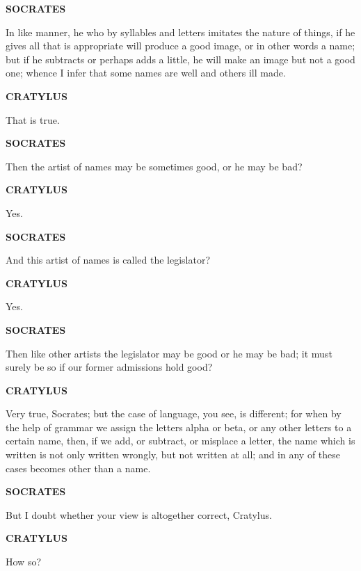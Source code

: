 \documentclass[11pt,letter]{article}
\begin{document}
\par \textbf{SOCRATES}
\par   In like manner, he who by syllables and letters imitates the nature of things, if he gives all that is appropriate will produce a good image, or in other words a name; but if he subtracts or perhaps adds a little, he will make an image but not a good one; whence I infer that some names are well and others ill made.

\par \textbf{CRATYLUS}
\par   That is true.

\par \textbf{SOCRATES}
\par   Then the artist of names may be sometimes good, or he may be bad?

\par \textbf{CRATYLUS}
\par   Yes.

\par \textbf{SOCRATES}
\par   And this artist of names is called the legislator?

\par \textbf{CRATYLUS}
\par   Yes.

\par \textbf{SOCRATES}
\par   Then like other artists the legislator may be good or he may be bad; it must surely be so if our former admissions hold good?

\par \textbf{CRATYLUS}
\par   Very true, Socrates; but the case of language, you see, is different; for when by the help of grammar we assign the letters alpha or beta, or any other letters to a certain name, then, if we add, or subtract, or misplace a letter, the name which is written is not only written wrongly, but not written at all; and in any of these cases becomes other than a name.

\par \textbf{SOCRATES}
\par   But I doubt whether your view is altogether correct, Cratylus.

\par \textbf{CRATYLUS}
\par   How so?
\end{document}
